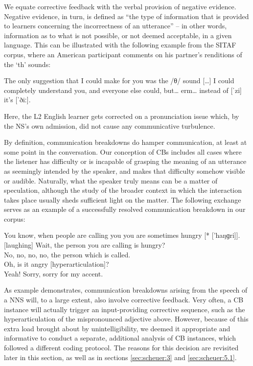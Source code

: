\documentclass[output=paper,colorlinks,citecolor=brown,modfonts,nonflat]{../langscibook}
\begin{document}
We equate corrective feedback with the verbal provision of negative evidence. Negative evidence, in turn, is defined as “the type of information that is provided to learners concerning the incorrectness of an utterance” \citep[225]{Gass2003} – in other words, information as to what is not possible, or not deemed acceptable, in a given language. This can be illustrated with the following example from the SITAF corpus, where an American participant comments on his  partner’s renditions of the ‘th’ sounds:


\ea\label{ex:scheuer:1}
{\NS} {The} {only} {suggestion} {that} {I} {could} {make} {for} {you} {was} {the} {/θ/} {sound} {[…]} {I} {could} {completely} {understand} {you,} {and} {everyone} {else} {could,} {but…} {erm…} {instead} {of} {[ˈzi]} {it’s} {[ˈðiː].}
\z

Here, the L2 English learner gets corrected on a pronunciation issue which, by the NS’s own admission, did not cause any communicative turbulence.

By definition, communication breakdowns do hamper communication, at least at some point in the conversation. Our conception of CBs includes all cases where the listener has difficulty or is incapable of grasping the meaning of an utterance as seemingly intended by the speaker, and makes that difficulty somehow visible or audible. Naturally, what the speaker truly means can be a matter of speculation, although the study of the broader context in which the interaction takes place usually sheds sufficient light on the matter. The following exchange serves as an example of a successfully resolved communication breakdown in our corpus:


\ea\label{ex:scheuer:2}
{\NNS} {You} {know,} {when} {people} {are} {calling} {you} {you} {are} {sometimes} {hungry} [* ['haŋɡri]].\\
{\NS} [laughing] {Wait,} {the} {person} {you} {are} {calling} {is} {hungry?}\\
{\NNS} {No,} {no,} {no,} {no,} {the} {person} {which} {is} {called.}\\
{\NS} {Oh,} {is} {it} {angry} [hyperarticulation]?\\
{\NNS} {Yeah!} {Sorry,} {sorry} {for} {my} {accent.}
\z


As example  demonstrates, communication breakdowns arising from the speech of a NNS will, to a large extent, also involve corrective feedback. Very often, a CB instance will actually trigger an input-providing corrective sequence, such as the hyperarticulation of the mispronounced adjective above. However, because of this extra load brought about by unintelligibility, we deemed it appropriate and informative to conduct a separate, additional analysis of CB instances, which followed a different coding protocol. The reasons for this decision are revisited later in this section, as well as in sections \ref{sec:scheuer:3} and \ref{sec:scheuer:5.1}.
\end{document}
